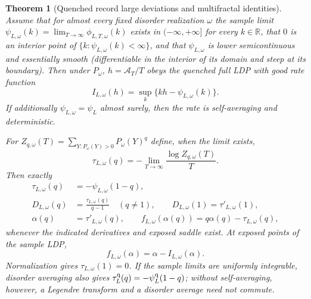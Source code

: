 \documentclass[aps,prx,reprint,superscriptaddress,nobibnotes,longbibliography]{revtex4-2}
\newtheorem{theorem}{Theorem}
\theoremstyle{remark}
\begin{document}
\begin{theorem}[Quenched record large deviations and multifractal identities]
\label{thm:record-mf}
Assume that for almost every fixed disorder realization $\omega$ the sample limit $\psi_{L,\omega}(k)=\lim_{T\to\infty}\phi_{L,T,\omega}(k)$ exists in $(-\infty,+\infty]$ for every $k\in\mathbb R$, that $0$ is an interior point of $\{k:\psi_{L,\omega}(k)<\infty\}$, and that $\psi_{L,\omega}$ is lower semicontinuous and essentially smooth (differentiable in the interior of its domain and steep at its boundary).  Then under $P_\omega$, $h=\mathcal A_T/T$ obeys the quenched full LDP with good rate function
\begin{equation}
 I_{L,\omega}(h)=\sup_k\{kh-\psi_{L,\omega}(k)\}.
 \label{eq:rate}
\end{equation}
If additionally $\psi_{L,\omega}=\psi_L$ almost surely, then the rate is self-averaging and deterministic.

For $Z_{q,\omega}(T)=\sum_{Y:P_\omega(Y)>0}P_\omega(Y)^q$ define, when the limit exists,
\begin{equation}
 \tau_{L,\omega}(q)=-\lim_{T\to\infty}\frac{\log Z_{q,\omega}(T)}{T}.
\end{equation}
Then exactly
\begin{align}
 \tau_{L,\omega}(q)&=-\psi_{L,\omega}(1-q),\label{eq:taupsi}\\
 D_{L,\omega}(q)&=\frac{\tau_{L,\omega}(q)}{q-1}\quad(q\ne1),\qquad
 D_{L,\omega}(1)=\tau'_{L,\omega}(1),\\
 \alpha(q)&=\tau'_{L,\omega}(q),\qquad
 f_{L,\omega}(\alpha(q))=q\alpha(q)-\tau_{L,\omega}(q),
 \label{eq:Legendre}
\end{align}
whenever the indicated derivatives and exposed saddle exist.  At exposed points of the sample LDP,
\begin{equation}
 f_{L,\omega}(\alpha)=\alpha-I_{L,\omega}(\alpha).
 \label{eq:fI}
\end{equation}
Normalization gives $\tau_{L,\omega}(1)=0$.  If the sample limits are uniformly integrable, disorder averaging also gives
$\tau_L^{\rm q}(q)=-\psi_L^{\rm q}(1-q)$; without self-averaging, however, a Legendre transform and a disorder average need not commute.
\end{theorem}
\end{document}
